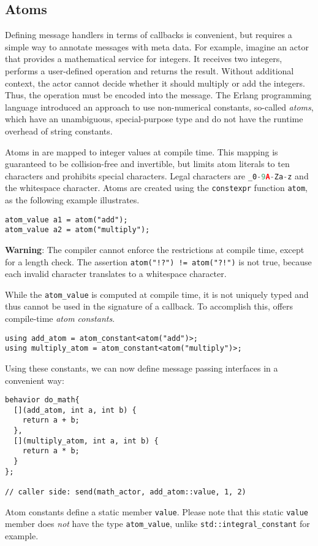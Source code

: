 \clearpage
\subsection{Atoms}
\label{atoms}

Defining message handlers in terms of callbacks is convenient, but requires a simple way to annotate messages with meta data.
For example, imagine an actor that provides a mathematical service for integers.
It receives two integers, performs a user-defined operation and returns the result.
Without additional context, the actor cannot decide whether it should multiply or add the integers.
Thus, the operation must be encoded into the message.
The Erlang programming language introduced an approach to use non-numerical
constants, so-called \textit{atoms}, which have an unambiguous, special-purpose type and do not have the runtime overhead of string constants.

Atoms in \lib are mapped to integer values at compile time.
This mapping is guaranteed to be collision-free and invertible, but limits atom literals to ten characters and prohibits special characters.
Legal characters are \lstinline[language=C++]^_0-9A-Za-z^ and the whitespace character.
Atoms are created using the \lstinline^constexpr^ function \lstinline^atom^, as the following example illustrates.

\begin{lstlisting}
atom_value a1 = atom("add");
atom_value a2 = atom("multiply");
\end{lstlisting}

\textbf{Warning}: The compiler cannot enforce the restrictions at compile time, except for a length check.
The assertion \lstinline^atom("!?") != atom("?!")^ is not true, because each invalid character translates to a whitespace character.

While the \lstinline^atom_value^ is computed at compile time, it is not uniquely typed and thus cannot be used in the signature of a callback.
To accomplish this, \lib offers compile-time \emph{atom constants}.

\begin{lstlisting}
using add_atom = atom_constant<atom("add")>;
using multiply_atom = atom_constant<atom("multiply")>;
\end{lstlisting}

Using these constants, we can now define message passing interfaces in a convenient way:

\begin{lstlisting}
behavior do_math{
  [](add_atom, int a, int b) {
    return a + b;
  },
  [](multiply_atom, int a, int b) {
    return a * b;
  }
};

// caller side: send(math_actor, add_atom::value, 1, 2)
\end{lstlisting}

Atom constants define a static member \lstinline^value^.
Please note that this static \lstinline^value^ member does \emph{not} have the type \lstinline^atom_value^, unlike \lstinline^std::integral_constant^ for example.

